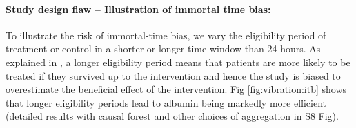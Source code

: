 \documentclass[10pt,letterpaper]{article}
\begin{document}
\paragraph{Study design flaw -- Illustration of immortal time bias:}

To illustrate the risk of immortal-time bias, we vary the eligibility period of
treatment or control in a shorter or longer time window than 24 hours. As
explained in , a longer eligibility period means that
patients are more likely to be treated if they survived up to the intervention
and hence the study is biased to overestimate the beneficial effect of the
intervention. Fig \ref{fig:vibration:itb} shows that longer eligibility
periods lead to albumin being markedly more efficient (detailed results with causal forest and other choices of aggregation in S8 Fig).
\end{document}
